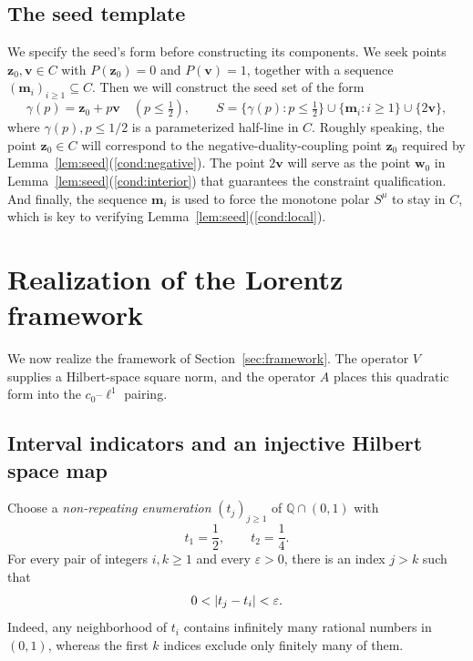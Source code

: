 \documentclass[11pt,a4paper]{article}
\theoremstyle{reportstyle}
\numberwithin{equation}{section}
\newcommand{\Q}{\mathbb Q}
\newcommand{\bv}{\mathbf v}
\newcommand{\bz}{\mathbf z}
\newcommand{\bm}{\mathbf m}
\newcommand{\bw}{\mathbf w}
\DeclarePairedDelimiter{\abs}{\lvert}{\rvert}
\begin{document}
	\subsection{The seed template}
	\label{sec:template}
	We specify the seed's form before constructing its components. We seek
	points $\bz_0,\bv\in C$ with
	$P(\bz_0)=0$ and $P(\bv)=1$, together with a sequence
	$(\bm_i)_{i\ge1}\subseteq C$. Then we will construct the seed set of the form
	\begin{equation}
		\gamma(p)=\bz_0+p\bv\quad(p\le\tfrac12), \qquad S=\{\gamma(p):p\le\tfrac12\} \cup\{\bm_i:i\ge1\}\cup\{2\bv\},
		\label{eq:seed-template}
	\end{equation}
	where $\gamma(p), p\leq 1/2$ is a parameterized half-line in $C$. %
	Roughly speaking, the point $\bz_0\in C$ will correspond to the negative-duality-coupling point $\bz_0$ required by Lemma~\ref{lem:seed}\textup{(\ref{cond:negative})}. %
	The point $2\bv$ will serve as the point $\bw_0$ in Lemma~\ref{lem:seed}\textup{(\ref{cond:interior})} that guarantees the constraint qualification.
	And finally, the sequence $\bm_i$ is used to force the monotone polar $S^\mu$ to stay in $C$, which is key to verifying Lemma~\ref{lem:seed}\textup{(\ref{cond:local})}. %


	\section{Realization of the Lorentz framework}
	\label{sec:realization}
	We now realize the framework of Section~\ref{sec:framework}.
	The operator $V$ supplies a Hilbert-space square norm, and the operator
	$A$ places this quadratic form into the $c_0$--$\ell^1$ pairing.

	\subsection{Interval indicators and an injective Hilbert space map}
	\label{subsec:V}

	Choose a \emph{non-repeating enumeration} $(t_j)_{j\ge1}$ of $\Q\cap(0,1)$ with
	\begin{equation*}
		t_1=\frac12,\qquad t_2=\frac14.
	\end{equation*}
	For every pair of integers $i,k\ge1$ and every $\varepsilon>0$,
	there is an index $j>k$ such that
	\begin{equation}
		0<\abs{t_j-t_i}<\varepsilon.
		\label{eq:recurrence}
	\end{equation}
	Indeed, any neighborhood of $t_i$ contains infinitely many rational
	numbers in $(0,1)$, whereas the first $k$ indices exclude only finitely many of them.
\end{document}
